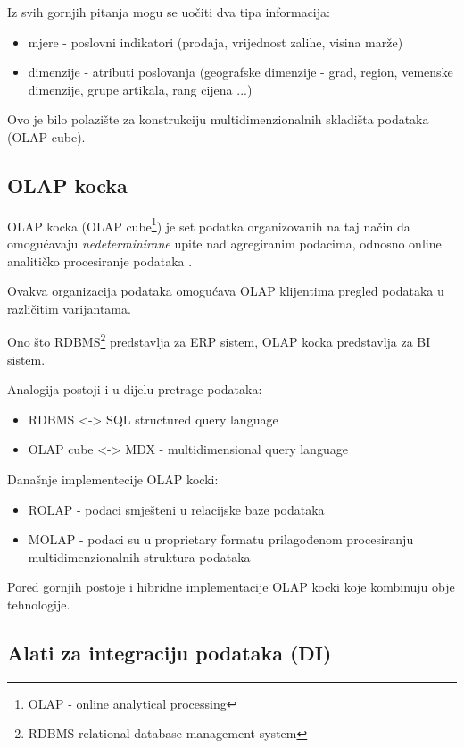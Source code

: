 \documentclass[times, utf8, seminar]{fit}
\begin{document}
Iz svih gornjih pitanja mogu se uočiti dva tipa informacija:

\begin{itemize}
   \item mjere - poslovni indikatori (prodaja, vrijednost zalihe, visina marže)
   \item dimenzije - atributi poslovanja (geografske dimenzije - grad, region, vemenske dimenzije, grupe artikala, rang cijena ...)
\end{itemize}

Ovo je bilo polazište za konstrukciju multidimenzionalnih skladišta podataka (OLAP cube).
 
\subsection{OLAP kocka}

OLAP kocka  (OLAP cube\footnote{OLAP - online analytical processing}) je set podatka organizovanih na taj način da omogućavaju \emph{nedeterminirane} upite nad agregiranim podacima, odnosno online analitičko procesiranje podataka \cite{web:wikipedia:olap_cube}.

Ovakva organizacija podataka omogućava OLAP klijentima pregled podataka u različitim varijantama.

Ono što RDBMS\footnote{RDBMS relational database management system} predstavlja za ERP sistem, OLAP kocka predstavlja za BI sistem.

Analogija postoji i u dijelu pretrage podataka:

\begin{itemize}
 \item RDBMS <-> SQL structured query language
 \item OLAP cube <-> MDX - multidimensional query language
\end{itemize}

Današnje implementecije OLAP kocki:

\begin{itemize}
  \item ROLAP - podaci smješteni u relacijske baze podataka
  \item MOLAP - podaci su u proprietary formatu prilagođenom procesiranju multidimenzionalnih struktura podataka
\end{itemize}

Pored gornjih postoje i hibridne implementacije OLAP kocki koje kombinuju obje tehnologije.

\subsection{Alati za integraciju podataka (DI)}
\end{document}
